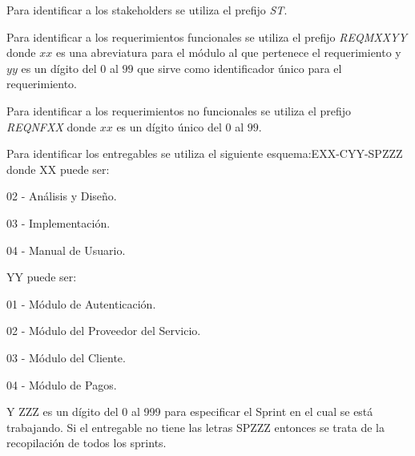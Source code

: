 \begin{Citemize}
	\item Para identificar a los stakeholders se utiliza el prefijo \textit{ST}.
	\item Para identificar a los requerimientos funcionales se utiliza el prefijo \textit{REQMXXYY} donde $xx$ es una abreviatura para el módulo al que pertenece el requerimiento y  $yy$ es un dígito del $0$ al $99$ que sirve como identificador único para el requerimiento.
	\item Para identificar a los requerimientos no funcionales se utiliza el prefijo \textit{REQNFXX} donde $xx$ es un dígito único del $0$ al $99$.
	\item Para identificar los entregables se utiliza el siguiente esquema:EXX-CYY-SPZZZ donde XX puede ser:
			\begin{Citemize}
				\item 02 - Análisis y Diseño.
				\item 03 - Implementación.
				\item 04 - Manual de Usuario.
			\end{Citemize}
		 YY puede ser:
		 	\begin{Citemize}
				\item 01 - Módulo de Autenticación.
				\item 02 - Módulo del Proveedor del Servicio.
				\item 03 - Módulo del Cliente.
				\item 04 - Módulo de Pagos.
			\end{Citemize}
		Y ZZZ es un dígito del 0 al 999 para especificar el Sprint en el cual se está trabajando. Si el entregable no tiene las letras SPZZZ entonces se trata de la recopilación de todos los sprints.
\end{Citemize}

